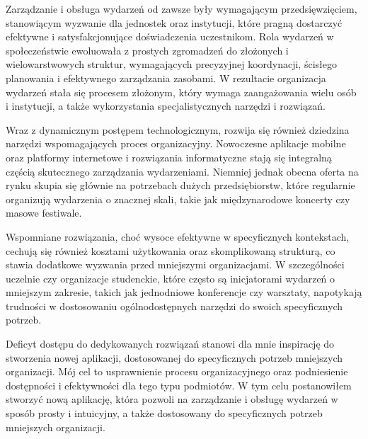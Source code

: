 
Zarządzanie i obsługa wydarzeń od zawsze były wymagającym przedsięwzięciem, stanowiącym wyzwanie dla jednostek oraz instytucji, które pragną dostarczyć efektywne i satysfakcjonujące doświadczenia uczestnikom. Rola wydarzeń w społeczeństwie ewoluowała z prostych zgromadzeń do złożonych i wielowarstwowych struktur, wymagających precyzyjnej koordynacji, ścisłego planowania i efektywnego zarządzania zasobami. W rezultacie organizacja wydarzeń stała się procesem złożonym, który wymaga zaangażowania wielu osób i instytucji, a także wykorzystania specjalistycznych narzędzi i rozwiązań.

Wraz z dynamicznym postępem technologicznym, rozwija się również dziedzina narzędzi wspomagających proces organizacyjny. Nowoczesne aplikacje mobilne oraz platformy internetowe i rozwiązania informatyczne stają się integralną częścią skutecznego zarządzania wydarzeniami. Niemniej jednak obecna oferta na rynku skupia się głównie na potrzebach dużych przedsiębiorstw, które regularnie organizują wydarzenia o znacznej skali, takie jak międzynarodowe koncerty czy masowe festiwale.

Wspomniane rozwiązania, choć wysoce efektywne w specyficznych kontekstach, cechują się również kosztami użytkowania oraz skomplikowaną strukturą, co stawia dodatkowe wyzwania przed mniejszymi organizacjami. W szczególności uczelnie czy organizacje studenckie, które często są inicjatorami wydarzeń o mniejszym zakresie, takich jak jednodniowe konferencje czy warsztaty, napotykają trudności w dostosowaniu ogólnodostępnych narzędzi do swoich specyficznych potrzeb.

Deficyt dostępu do dedykowanych rozwiązań stanowi dla mnie inspirację do stworzenia nowej aplikacji, dostosowanej do specyficznych potrzeb mniejszych organizacji. Mój cel to usprawnienie procesu organizacyjnego oraz podniesienie dostępności i efektywności dla tego typu podmiotów. W tym celu postanowiłem stworzyć nową aplikację, która pozwoli na zarządzanie i obsługę  wydarzeń w sposób prosty i intuicyjny, a także dostosowany do specyficznych potrzeb mniejszych organizacji.